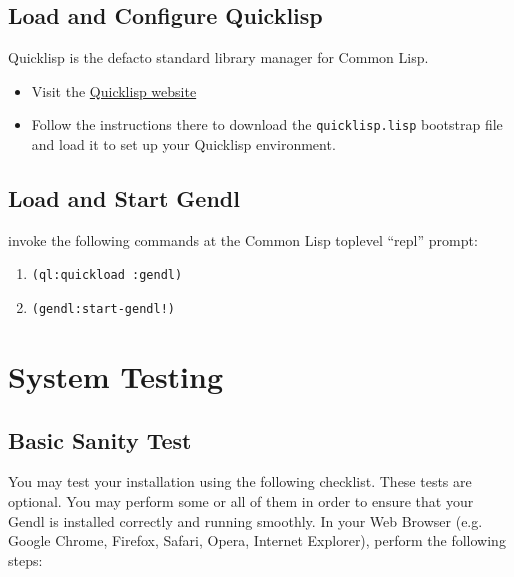 \documentclass [11pt]{book}
\begin{document}
\subsection{Load and Configure Quicklisp}

\label{subsec:loadandconfigurequicklisp}

Quicklisp is the defacto standard library manager for Common
Lisp.

\begin{itemize}

\item Visit the \href{http://quicklisp.org}{Quicklisp website}

\item Follow the instructions there to download the \texttt{quicklisp.lisp} bootstrap file and load it to set up your Quicklisp environment.

\end{itemize}



\subsection{Load and Start Gendl}

\label{subsec:loadandstartgendl}

invoke the following commands at the Common Lisp toplevel ``repl'' prompt:

\begin{enumerate}

\item \texttt{(ql:quickload :gendl)}

\item \texttt{(gendl:start-gendl!)}

\end{enumerate}



\section{System Testing}

\label{sec:systemtesting}



\subsection{Basic Sanity Test}

\label{subsec:basicsanitytest}

You may test your installation using the following
checklist. These tests are optional. You may perform some or all of
them in order to ensure that your Gendl is installed correctly and
running smoothly. In your Web Browser (e.g. Google Chrome, Firefox,
Safari, Opera, Internet Explorer), perform the following steps:
\end{document}
